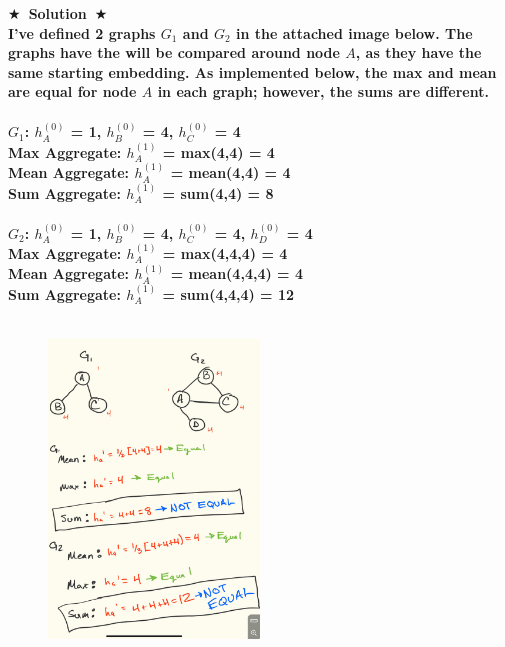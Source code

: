 \documentclass{article}
\numberwithin{figure}{section}
\newcommand{\Solution}[1]{{\medskip \color{red} \bf $\bigstar$~\sf \textbf{Solution}~$\bigstar$ \sf #1 } \bigskip}
\begin{document}
\Solution{\\I've defined 2 graphs $G_1$ and $G_2$ in the attached image below. The graphs have the will be compared around node $A$, as they have the same starting embedding. As implemented below, the max and mean are equal for node $A$ in each graph; however, the sums are different.
\\\\
\hspace{2cm}$G_1$: $h^{(0)}_{A}$ = 1, $h^{(0)}_{B}$ = 4, $h^{(0)}_{C}$ = 4
\\
\hspace{2cm} Max Aggregate: $h^{(1)}_{A}$ = max(4,4) = 4\\
\hspace{2cm} Mean Aggregate: $h^{(1)}_{A}$ = mean(4,4) = 4        \\
\hspace{2cm} Sum Aggregate: $h^{(1)}_{A}$ = sum(4,4) = 8           \\\\
\hspace{2cm}$G_2$: $h^{(0)}_{A}$ = 1, $h^{(0)}_{B}$ = 4, $h^{(0)}_{C}$ = 4, $h^{(0)}_{D}$ = 4
\\
\hspace{2cm} Max Aggregate: $h^{(1)}_{A}$ = max(4,4,4) = 4\\
\hspace{2cm} Mean Aggregate: $h^{(1)}_{A}$ = mean(4,4,4) = 4        \\
\hspace{2cm} Sum Aggregate: $h^{(1)}_{A}$ = sum(4,4,4) = 12           \\\\
\begin{figure}[H]
        \centering
\centering \includegraphics[width=0.5\textwidth]{CS224W_Homework1/graph_aggregate.jpg}
        \end{figure}
}
\end{document}
